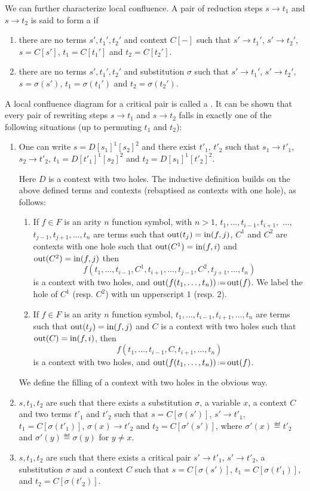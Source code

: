We can further characterize local confluence. 
A pair of reduction steps $s \to t_1$ and $s\to t_2$ is said to form a    if 
\begin{enumerate}
  \item there are no terms $s',t_1',t_2'$ and context $C[-]$ such that $s' \to t_1'$, $s' \to t_2'$, $s=C[s']$, $t_1=C[t_1']$ and $t_2=C[t_2']$.
  \item there are no terms $s',t_1',t_2'$ and substitution $\sigma$ such that $s' \to t_1'$, $s' \to t_2'$, $s=\sigma(s')$, $t_1=\sigma(t_1')$ and $t_2=\sigma(t_2')$.
\end{enumerate}
A local confluence diagram  for a critical pair is called a .
It can be shown that every pair of rewriting steps  $s \to t_1$ and $s\to t_2$ falls in exactly one of the following situations (up to permuting $t_1$ and $t_2$):
\begin{enumerate}
\item[(a1)] One can write $s=D[s_1]^1[s_2]^2$ and there exist $t'_1$, $t'_2$ such that $s_1\to t'_1$, $s_2\to t'_2$, $t_1=D[t'_1]^1[s_2]^2$ and $t_2=D[s_1]^1[t'_2]^2$. 

\smallskip\noindent
Here $D$ is a context with two holes. The inductive definition  builds on the above defined terms and  contexts (rebaptised  as contexts with one hole), as follows: 
\begin{enumerate}
 \item[(1)] If $f \in F$ is an arity $n$ function symbol, with $n>1$, $t_1,\ldots,t_{i-1},t_{i+1},$ $\ldots,$ $t_{j-1},t_{j+1},\ldots,t_n$ are terms such that 
 $\mathrm{out}(t_j)=\mathrm{in}(f,j)$, $C^1$ and $C^2$  are contexts with one hole such that $\mathrm{out}(C^1)=\mathrm{in}(f,i)$ and $\mathrm{out}(C^2)=\mathrm{in}(f,j)$
 then 
  $$f(t_1,\ldots,t_{i-1},C^1,t_{i+1},\ldots,t_{j-1},C^2,t_{j+1},\ldots,t_n)$$
   is a context with two holes, and $\outsort(f(t_1,\ldots,t_n))\eqdef \outsort(f)$.  We label the hole of $C^1$ (resp. $C^2$) with un upperscript $1$ (resp. $2$).
 \item[(2)] If $f \in F$ is an arity $n$ function symbol, $t_1,\ldots,t_{i-1},t_{i+1},\ldots,t_n$ are terms such that $\mathrm{out}(t_j)=\mathrm{in}(f,j)$ and $C$ is a context with two holes such that $\mathrm{out}(C)=\mathrm{in}(f,i)$, then 
  $$f(t_1,\ldots,t_{i-1},C,t_{i+1},\ldots,t_n)$$
 is a context with two holes, and $\outsort(f(t_1,\ldots,t_n))\eqdef \outsort(f)$.
\end{enumerate}
We define the filling of a context with two holes in the obvious way.
\item[(a2)] $s,t_1,t_2$ are such that there exists a substitution $\sigma$, a variable $x$, a context $C$  and two terms $t'_1$ and $t'_2$ such that
$s=C[\sigma(s')]$, $s'\to t'_1$, $t_1=C[\sigma(t'_1)]$, $\sigma(x)\to t'_2$ and 
$t_2=C[\sigma'(s')]$, where $\sigma'(x)\eqdef t'_2$ and $\sigma'(y)\eqdef \sigma(y)$ for $y\not = x$.
\item[(b)] $s,t_1,t_2$ are such that there exists a critical pair $s'\rightarrow t'_1$, $s'\rightarrow t'_2$, a substitution $\sigma$ and a context $C$ such that $s=C[\sigma(s')]$, $t_1=C[\sigma(t'_1)]$, and $t_2=C[\sigma(t'_2)]$.
\end{enumerate}
